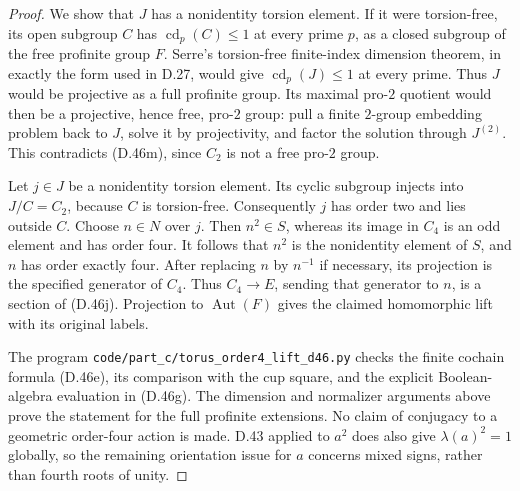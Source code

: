 \begin{proof}
We show that $J$ has a nonidentity torsion element.
If it were torsion-free, its open subgroup $C$ has
$\operatorname{cd}_p(C)\leq1$ at every prime $p$,
as a closed subgroup of the free profinite group $F$.
Serre's torsion-free finite-index dimension theorem,
in exactly the form used in D.27, would give
$\operatorname{cd}_p(J)\leq1$ at every prime.
Thus $J$ would be projective as a full profinite
group.
Its maximal pro-$2$ quotient would then be a
projective, hence free, pro-$2$ group: pull a finite
$2$-group embedding problem back to $J$, solve it
by projectivity, and factor the solution through
$J^{(2)}$.
This contradicts (D.46m), since $C_2$ is not a free
pro-$2$ group.

Let $j\in J$ be a nonidentity torsion element.
Its cyclic subgroup injects into $J/C=C_2$, because
$C$ is torsion-free.
Consequently $j$ has order two and lies outside $C$.
Choose $n\in N$ over $j$.
Then $n^2\in S$, whereas its image in $C_4$ is an
odd element and has order four.
It follows that $n^2$ is the nonidentity element
of $S$, and $n$ has order exactly four.
After replacing $n$ by $n^{-1}$ if necessary, its
projection is the specified generator of $C_4$.
Thus $C_4\to E$, sending that generator to $n$,
is a section of (D.46j).
Projection to $\operatorname{Aut}(F)$ gives the
claimed homomorphic lift with its original labels.

The program \texttt{code/part\_c/torus\_order4\_lift\_d46.py}
checks the finite cochain formula (D.46e), its
comparison with the cup square, and the explicit
Boolean-algebra evaluation in (D.46g).
The dimension and normalizer arguments above prove
the statement for the full profinite extensions.
No claim of conjugacy to a geometric order-four
action is made.  D.43 applied to $a^2$ does also
give $\lambda(a)^2=1$ globally, so the remaining
orientation issue for $a$ concerns mixed signs,
rather than fourth roots of unity.
\end{proof}
